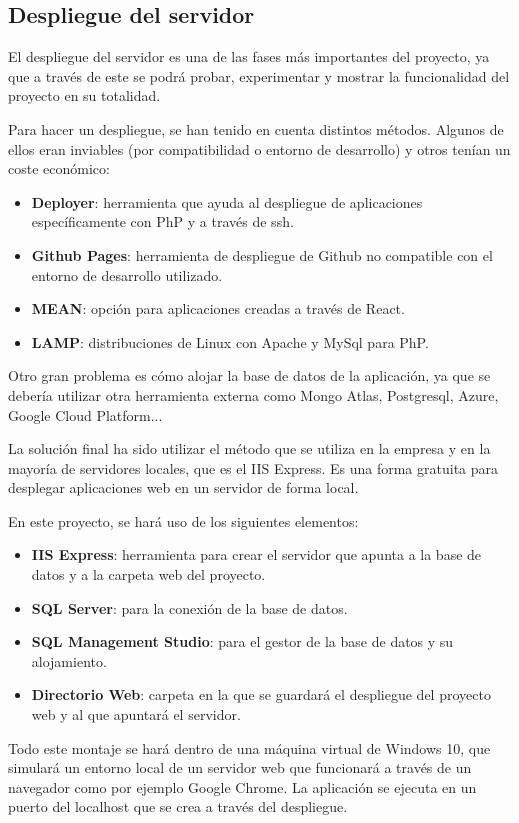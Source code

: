 \subsection{Despliegue del servidor}
El despliegue del servidor es una de las fases más importantes del proyecto, ya que a través de este se podrá probar, experimentar y mostrar la funcionalidad del proyecto en su totalidad. 

Para hacer un despliegue, se han tenido en cuenta distintos métodos. Algunos de ellos eran inviables (por compatibilidad o entorno de desarrollo) y otros tenían un coste económico:
\begin{itemize}
 \item \textbf{Deployer}: herramienta que ayuda al despliegue de aplicaciones específicamente con PhP y a través de ssh.
 \item \textbf{Github Pages}: herramienta de despliegue de Github no compatible con el entorno de desarrollo utilizado.
 \item \textbf{MEAN}: opción para aplicaciones creadas a través de React.
 \item \textbf{LAMP}: distribuciones de Linux con Apache y MySql para PhP.
\end{itemize}

Otro gran problema es cómo alojar la base de datos de la aplicación, ya que se debería utilizar otra herramienta externa como Mongo Atlas, Postgresql, Azure, Google Cloud Platform...

La solución final ha sido utilizar el método que se utiliza en la empresa y en la mayoría de servidores locales, que es el IIS Express. Es una forma gratuita para desplegar aplicaciones web en un servidor de forma local. 

En este proyecto, se hará uso de los siguientes elementos:
\begin{itemize}
 \item \textbf{IIS Express}: herramienta para crear el servidor que apunta a la base de datos y a la carpeta web del proyecto.
 \item \textbf{SQL Server}: para la conexión de la base de datos.
 \item \textbf{SQL Management Studio}: para el gestor de la base de datos y su alojamiento. 
 \item \textbf{Directorio Web}: carpeta en la que se guardará el despliegue del proyecto web y al que apuntará el servidor.
\end{itemize}

Todo este montaje se hará dentro de una máquina virtual de Windows 10, que simulará un entorno local de un servidor web que funcionará a través de un navegador como por ejemplo Google Chrome. La aplicación se ejecuta en un puerto del localhost que se crea a través del despliegue.

